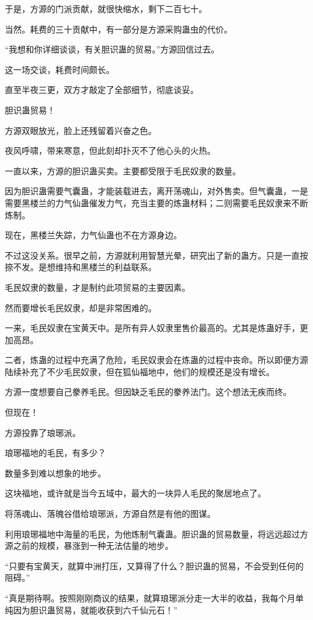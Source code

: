 \begin{this_body}
于是，方源的门派贡献，就很快缩水，剩下二百七十。

当然。耗费的三十贡献中，有一部分是方源采购蛊虫的代价。

“我想和你详细谈谈，有关胆识蛊的贸易。”方源回信过去。

这一场交谈，耗费时间颇长。

直至半夜三更，双方才敲定了全部细节，彻底谈妥。

胆识蛊贸易！

方源双眼放光，脸上还残留着兴奋之色。

夜风呼啸，带来寒意，但此刻却扑灭不了他心头的火热。

一直以来，方源的胆识蛊买卖。主要都受限于毛民奴隶的数量。

因为胆识蛊需要气囊蛊，才能装载进去，离开荡魂山，对外售卖。但气囊蛊，一是需要黑楼兰的力气仙蛊催发力气，充当主要的炼蛊材料；二则需要毛民奴隶来不断炼制。

现在，黑楼兰失踪，力气仙蛊也不在方源身边。

不过这没关系。很早之前，方源就利用智慧光晕，研究出了新的蛊方。只是一直按捺不发。是想维持和黑楼兰的利益联系。

毛民奴隶的数量，才是制约此项贸易的主要因素。

然而要增长毛民奴隶，却是非常困难的。

一来，毛民奴隶在宝黄天中。是所有异人奴隶里售价最高的。尤其是炼蛊好手，更加高昂。

二者，炼蛊的过程中充满了危险，毛民奴隶会在炼蛊的过程中丧命。所以即便方源陆续补充了不少毛民奴隶，但在狐仙福地中，他们的规模还是没有增长。

方源一度想要自己豢养毛民。但因缺乏毛民的豢养法门。这个想法无疾而终。

但现在！

方源投靠了琅琊派。

琅琊福地的毛民，有多少？

数量多到难以想象的地步。

这块福地，或许就是当今五域中，最大的一块异人毛民的聚居地点了。

将荡魂山、落魄谷借给琅琊派，方源自然是有他的图谋。

利用琅琊福地中海量的毛民，为他炼制气囊蛊。胆识蛊的贸易数量，将远远超过方源之前的规模，暴涨到一种无法估量的地步。

“只要有宝黄天，就算中洲打压，又算得了什么？胆识蛊的贸易，不会受到任何的阻碍。”

“真是期待啊。按照刚刚商议的结果，就算琅琊派分走一大半的收益，我每个月单纯因为胆识蛊贸易，就能收获到六千仙元石！”


\end{this_body}
